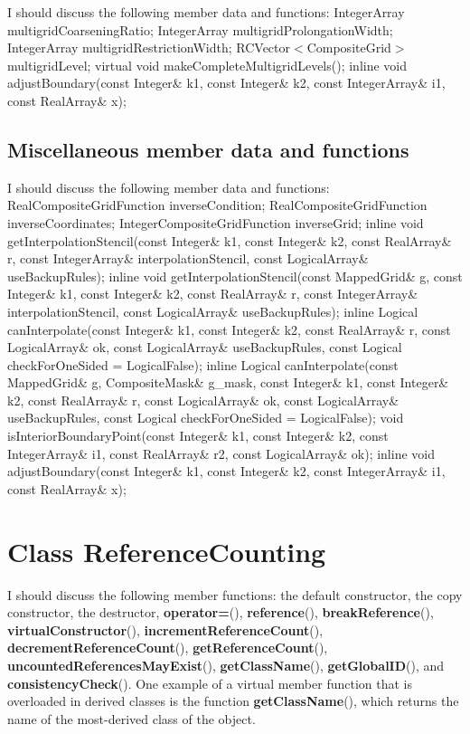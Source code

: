 \documentclass{article}
\begin{document}
I should discuss the following member data and functions:
    IntegerArray                 multigridCoarseningRatio;
    IntegerArray                 multigridProlongationWidth;
    IntegerArray                 multigridRestrictionWidth;
    RCVector$<$CompositeGrid$>$  multigridLevel;
    virtual void makeCompleteMultigridLevels();
    inline void adjustBoundary(const Integer\& k1, const Integer\& k2, const IntegerArray\& i1, const RealArray\& x);

\subsection{Miscellaneous member data and functions}
\label{CompositeGrid:Miscellaneous}

I should discuss the following member data and functions:
    RealCompositeGridFunction    inverseCondition;
    RealCompositeGridFunction    inverseCoordinates;
    IntegerCompositeGridFunction inverseGrid;
    inline void getInterpolationStencil(const Integer\& k1, const Integer\& k2, const RealArray\& r, const IntegerArray\& interpolationStencil, const LogicalArray\& useBackupRules);
    inline void getInterpolationStencil(const MappedGrid\& g, const Integer\& k1, const Integer\& k2, const RealArray\& r, const IntegerArray\& interpolationStencil, const LogicalArray\& useBackupRules);
    inline Logical canInterpolate(const Integer\& k1, const Integer\& k2, const RealArray\& r, const LogicalArray\& ok, const LogicalArray\& useBackupRules, const Logical checkForOneSided = LogicalFalse);
    inline Logical canInterpolate(const MappedGrid\& g, CompositeMask\& g\_mask, const Integer\& k1, const Integer\& k2, const RealArray\& r, const LogicalArray\& ok, const LogicalArray\& useBackupRules, const Logical checkForOneSided = LogicalFalse);
    void isInteriorBoundaryPoint(const Integer\& k1, const Integer\& k2, const IntegerArray\& i1, const RealArray\& r2, const LogicalArray\& ok);
    inline void adjustBoundary(const Integer\& k1, const Integer\& k2, const IntegerArray\& i1, const RealArray\& x);

\appendix %

\section{Class \textbf{ReferenceCounting}}
\label{ReferenceCounting}

I should discuss the following member functions:
the default constructor,
the copy constructor,
the destructor,
\textbf{operator=}(),
\textbf{reference}(),
\textbf{breakReference}(),
\textbf{virtualConstructor}(),
\textbf{incrementReferenceCount}(),
\textbf{decrementReferenceCount}(),
\textbf{getReferenceCount}(),
\textbf{uncountedReferencesMayExist}(),
\textbf{getClassName}(),
\textbf{getGlobalID}(), and
\textbf{consistencyCheck}().
One example of a virtual member function that is overloaded in derived
classes is the function \textbf{getClassName}(), which returns the
name of the most-derived class of the object.

\printindex
\end{document}
